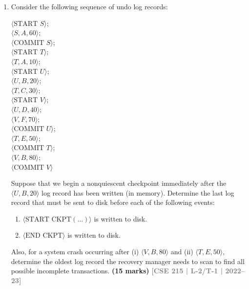 \documentclass[12pt]{article}
\newcommand{\yr}[1]{\hfill\textcolor{gray}{\small\textbf{[#1]}}}
\newcommand{\mk}[1]{\textcolor{orange!70!black}{\small\textbf{(#1 marks)}}}
\begin{document}
\begin{enumerate}
\item Consider the following sequence of undo log records:
\begin{center}
\small\ttfamily
$\langle\text{START } S\rangle$; \\
$\langle S, A, 60\rangle$; \\
$\langle\text{COMMIT } S\rangle$; \\
$\langle\text{START } T\rangle$; \\
$\langle T, A, 10\rangle$; \\
$\langle\text{START } U\rangle$; \\
$\langle U, B, 20\rangle$; \\
$\langle T, C, 30\rangle$; \\
$\langle\text{START } V\rangle$; \\
$\langle U, D, 40\rangle$; \\
$\langle V, F, 70\rangle$; \\
$\langle\text{COMMIT } U\rangle$; \\
$\langle T, E, 50\rangle$; \\
$\langle\text{COMMIT } T\rangle$; \\
$\langle V, B, 80\rangle$; \\
$\langle\text{COMMIT } V\rangle$
\end{center}
Suppose that we begin a nonquiescent checkpoint immediately after the $\langle U, B, 20\rangle$ log record has been written (in memory). Determine the last log record that must be sent to disk before each of the following events:
\begin{enumerate}
  \item $\langle\text{START CKPT}(\ldots)\rangle$ is written to disk.
  \item $\langle\text{END CKPT}\rangle$ is written to disk.
\end{enumerate}
Also, for a system crash occurring after (i) $\langle V, B, 80\rangle$ and (ii) $\langle T, E, 50\rangle$, determine the oldest log record the recovery manager needs to scan to find all possible incomplete transactions.
\mk{15} \yr{CSE 215 | L-2/T-1 | 2022--23}



\end{enumerate}
\end{document}
